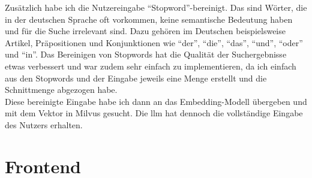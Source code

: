 Zusätzlich habe ich die Nutzereingabe \enquote{Stopword}-bereinigt. Das sind Wörter, die in der deutschen Sprache oft vorkommen, keine semantische Bedeutung haben und für die  
Suche irrelevant sind. Dazu gehören im Deutschen beispielsweise Artikel, Präpositionen und Konjunktionen wie \enquote{der}, \enquote{die}, \enquote{das}, \enquote{und}, \enquote{oder} und \enquote{in}.  
Das Bereinigen von Stopwords hat die Qualität der Suchergebnisse etwas verbessert und war zudem sehr einfach zu implementieren, da ich einfach aus den Stopwords und der  
Eingabe jeweils eine Menge erstellt und die Schnittmenge abgezogen habe.\\  
Diese bereinigte Eingabe habe ich dann an das Embedding-Modell übergeben und mit dem Vektor in Milvus gesucht.  
Die \gls{llm} hat dennoch die vollständige Eingabe des Nutzers erhalten.

\pagebreak
\section{Frontend}\label{sec:umsetzung_frontend}
